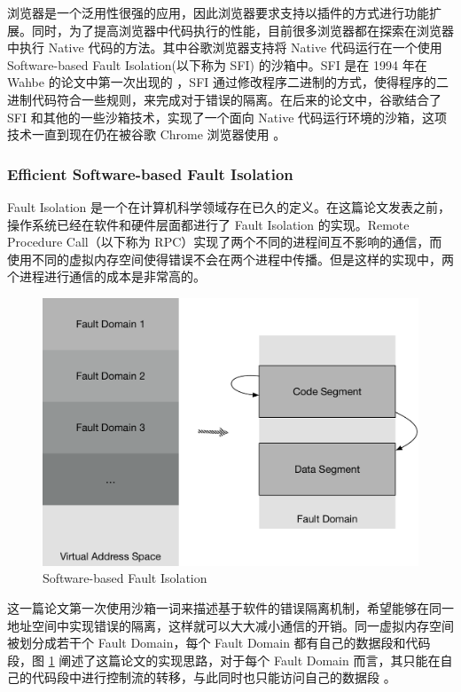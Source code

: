 \documentclass[final,5p,times]{elsarticle}
\begin{document}
浏览器是一个泛用性很强的应用，因此浏览器要求支持以插件的方式进行功能扩展。同时，为了提高浏览器中代码执行的性能，目前很多浏览器都在探索在浏览器中执行 Native 代码的方法。其中谷歌浏览器支持将 Native 代码运行在一个使用 Software-based Fault Isolation(以下称为 SFI) 的沙箱中。SFI 是在 1994 年在 Wahbe 的论文中第一次出现的 \cite{wahbe1994efficient}，SFI 通过修改程序二进制的方式，使得程序的二进制代码符合一些规则，来完成对于错误的隔离。在后来的论文中，谷歌结合了 SFI 和其他的一些沙箱技术，实现了一个面向 Native 代码运行环境的沙箱，这项技术一直到现在仍在被谷歌 Chrome 浏览器使用 \cite{nacl}。

\subsubsection{Efficient Software-based Fault Isolation}
\label{sss:esfi}

Fault Isolation 是一个在计算机科学领域存在已久的定义。在这篇论文发表之前，操作系统已经在软件和硬件层面都进行了 Fault Isolation 的实现。Remote Procedure Call（以下称为 RPC）实现了两个不同的进程间互不影响的通信，而使用不同的虚拟内存空间使得错误不会在两个进程中传播。但是这样的实现中，两个进程进行通信的成本是非常高的。

\begin{figure}
\centering
\includegraphics[width=0.8\linewidth]{imgs/sfi}
\caption{Software-based Fault Isolation}
\label{fig:sfi}
\end{figure}

这一篇论文第一次使用沙箱一词来描述基于软件的错误隔离机制，希望能够在同一地址空间中实现错误的隔离，这样就可以大大减小通信的开销。同一虚拟内存空间被划分成若干个 Fault Domain，每个 Fault Domain 都有自己的数据段和代码段，图 \ref{fig:sfi} 阐述了这篇论文的实现思路，对于每个 Fault Domain 而言，其只能在自己的代码段中进行控制流的转移，与此同时也只能访问自己的数据段 \cite{wahbe1994efficient}。
\end{document}
